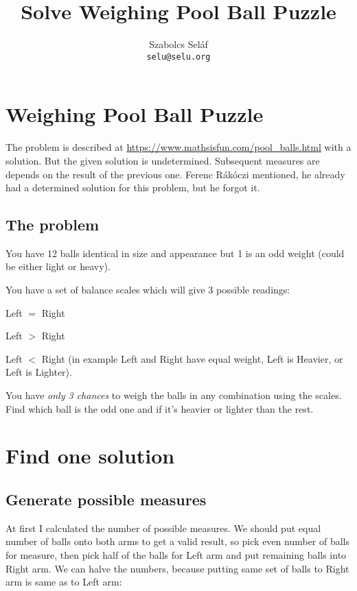 \documentclass[11pt]{article} %
\title{Solve Weighing Pool Ball Puzzle}
\author{Szabolcs Seláf \\ \texttt{selu@selu.org}}
\begin{document}
\maketitle

\section{Weighing Pool Ball Puzzle}

The problem is described at \url{https://www.mathsisfun.com/pool_balls.html} with a solution. But the given solution is undetermined. Subsequent measures are depends on the result of the previous one. Ferenc Rákóczi mentioned, he already had a determined solution for this problem, but he forgot it.

\subsection{The problem}

You have 12 balls identical in size and appearance but 1 is an odd weight (could be either light or heavy).

You have a set of balance scales which will give 3 possible readings:

\begin{asparaitem}
\item Left $=$ Right
\item Left $>$ Right
\item Left $<$ Right (in example Left and Right have equal weight, Left is Heavier, or Left is Lighter).
\end{asparaitem}

You have \emph{only 3 chances} to weigh the balls in any combination using the scales.
Find which ball is the odd one and if it's heavier or lighter than the rest.

\section{Find one solution}

\subsection{Generate possible measures} \label{one_solution}

At first I calculated the number of possible measures. We should put equal number of balls onto both arms to get a valid result, so pick even number of balls for measure, then pick half of the balls for Left arm and put remaining balls into Right arm. We can halve the numbers, because putting same set of balls to Right arm is same as to Left arm:
\end{document}
